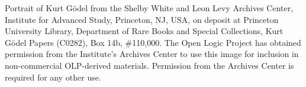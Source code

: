 Portrait of Kurt G\"odel from the Shelby White and Leon Levy Archives
Center, Institute for Advanced Study, Princeton, NJ, USA, on deposit
at Princeton University Library, Department of Rare Books and Special
Collections, Kurt G\"odel Papers (C0282), Box 14b, \#110,000.  The
Open Logic Project has obtained permission from the Institute's
Archives Center to use this image for inclusion in non-commercial
OLP-derived materials.  Permission from the Archives Center is
required for any other use.
